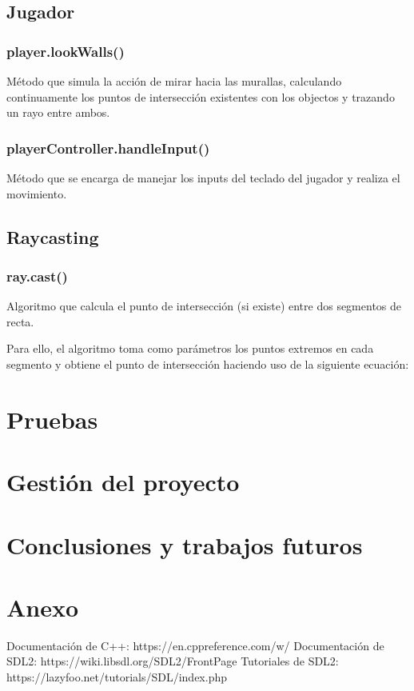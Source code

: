 \documentclass{article}
\begin{document}
		\subsection{Jugador}
			\subsubsection{player.lookWalls()}
				Método que simula la acción de mirar hacia las murallas, calculando continuamente los puntos de intersección existentes con los objectos y trazando un rayo entre ambos.
			
			\subsubsection{playerController.handleInput()}
				Método que se encarga de manejar los inputs del teclado del jugador y realiza el movimiento.
		
		\subsection{Raycasting}
			\subsubsection{ray.cast()}
				Algoritmo que calcula el punto de intersección (si existe) entre dos segmentos de recta.
				
				Para ello, el algoritmo toma como parámetros los puntos extremos en cada segmento y obtiene el punto de intersección haciendo uso de la siguiente ecuación:
				
	
	\section{Pruebas}
	
	\section{Gestión del proyecto}
	
	\section{Conclusiones y trabajos futuros}
	
	\section{Anexo}
		Documentación de C++: https://en.cppreference.com/w/
		Documentación de SDL2: https://wiki.libsdl.org/SDL2/FrontPage
		Tutoriales de SDL2: https://lazyfoo.net/tutorials/SDL/index.php
\end{document}
